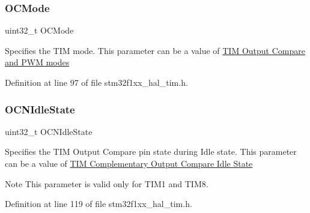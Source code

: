 \mbox{\label{struct_t_i_m___o_c___init_type_def_add4ac9143086c89effbede5c54e958bf}} 
\subsubsection{\texorpdfstring{O\+C\+Mode}{OCMode}}
{\footnotesize\ttfamily uint32\+\_\+t O\+C\+Mode}

Specifies the T\+IM mode. This parameter can be a value of \hyperlink{group___t_i_m___output___compare__and___p_w_m__modes}{T\+IM Output Compare and P\+WM modes} 

Definition at line 97 of file stm32f1xx\+\_\+hal\+\_\+tim.\+h.

\mbox{\label{struct_t_i_m___o_c___init_type_def_a78d21970d78c1e3e328692743406ba25}} 
\subsubsection{\texorpdfstring{O\+C\+N\+Idle\+State}{OCNIdleState}}
{\footnotesize\ttfamily uint32\+\_\+t O\+C\+N\+Idle\+State}

Specifies the T\+IM Output Compare pin state during Idle state. This parameter can be a value of \hyperlink{group___t_i_m___output___compare___n___idle___state}{T\+IM Complementary Output Compare Idle State} \begin{DoxyNote}{Note}
This parameter is valid only for T\+I\+M1 and T\+I\+M8. 
\end{DoxyNote}


Definition at line 119 of file stm32f1xx\+\_\+hal\+\_\+tim.\+h.

\mbox{\label{struct_t_i_m___o_c___init_type_def_a978da9dd7cda80eb5fe8d04828b9bbcc}} 
